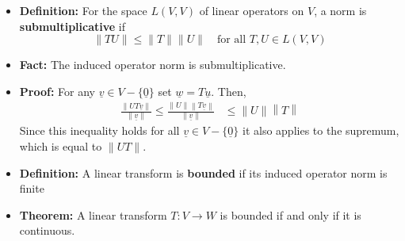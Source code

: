 \documentclass[11pt,twoside]{report}
\newcommand{\vecnot}{\underline}
\begin{document}
\begin{itemize}
\item \textbf{Definition:} For the space $L(V,V)$ of linear operators on $V$, a norm is  \textbf{submultiplicative} if 
\[
\| T U \| \leq \|T\| \|U\| \quad \text{for all $T,U \in L(V,V)$}
\]


\item \textbf{Fact:} The induced operator norm is submultiplicative.

\item \textbf{Proof:} For any  $\vecnot{v} \in V - \{ \vecnot{0}\}$ set $\vecnot{w} = T \vecnot{u}$. Then, 
\begin{align*}
\frac{ \| UT \vecnot{v} \|}{\| \vecnot{v} \| }   \le \frac{ \| U \| \left \| T \vecnot{v} \right \|}{\| \vecnot{v} \| }  
& \le\| U\| \left \| T \right \|  %
\end{align*} 
Since this inequality holds for all  $\vecnot{v} \in V - \{ \vecnot{0}\}$  it also applies to the supremum, which is equal to $\| U T\|$. 


\item \textbf{Definition:}  A linear transform is \textbf{bounded} if its induced operator norm is finite

\item \textbf{Theorem:} A linear transform $T \colon V \to W$ is bounded if and only if it is continuous. 


\end{itemize}
\end{document}
